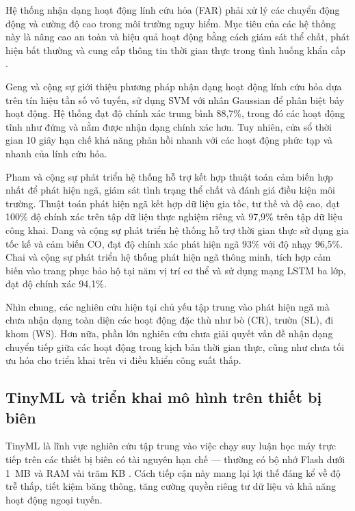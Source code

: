 Hệ thống nhận dạng hoạt động lính cứu hỏa (FAR) phải xử lý các chuyển động động và cường độ cao trong môi trường nguy hiểm. Mục tiêu của các hệ thống này là nâng cao an toàn và hiệu quả hoạt động bằng cách giám sát thể chất, phát hiện bất thường và cung cấp thông tin thời gian thực trong tình huống khẩn cấp \cite{Firefighterhealthcare2024, Thanhfire2019}.

Geng và cộng sự \cite{Geng2016} giới thiệu phương pháp nhận dạng hoạt động lính cứu hỏa dựa trên tín hiệu tần số vô tuyến, sử dụng SVM với nhân Gaussian để phân biệt bảy hoạt động. Hệ thống đạt độ chính xác trung bình 88,7\%, trong đó các hoạt động tĩnh như đứng và nằm được nhận dạng chính xác hơn. Tuy nhiên, cửa sổ thời gian 10 giây hạn chế khả năng phản hồi nhanh với các hoạt động phức tạp và nhanh của lính cứu hỏa.

Pham và cộng sự \cite{Thanhfire2019} phát triển hệ thống hỗ trợ kết hợp thuật toán cảm biến hợp nhất để phát hiện ngã, giám sát tình trạng thể chất và đánh giá điều kiện môi trường. Thuật toán phát hiện ngã kết hợp dữ liệu gia tốc, tư thế và độ cao, đạt 100\% độ chính xác trên tập dữ liệu thực nghiệm riêng và 97,9\% trên tập dữ liệu công khai. Dang và cộng sự \cite{Dang2022} phát triển hệ thống hỗ trợ thời gian thực sử dụng gia tốc kế và cảm biến CO, đạt độ chính xác phát hiện ngã 93\% với độ nhạy 96,5\%. Chai và cộng sự \cite{Chai2021} phát triển hệ thống phát hiện ngã thông minh, tích hợp cảm biến vào trang phục bảo hộ tại năm vị trí cơ thể và sử dụng mạng LSTM ba lớp, đạt độ chính xác 94,1\%.

Nhìn chung, các nghiên cứu hiện tại chủ yếu tập trung vào phát hiện ngã mà chưa nhận dạng toàn diện các hoạt động đặc thù như bò (CR), trườn (SL), đi khom (WS). Hơn nữa, phần lớn nghiên cứu chưa giải quyết vấn đề nhận dạng chuyển tiếp giữa các hoạt động trong kịch bản thời gian thực, cũng như chưa tối ưu hóa cho triển khai trên vi điều khiển công suất thấp.

\subsection{TinyML và triển khai mô hình trên thiết bị biên}

TinyML là lĩnh vực nghiên cứu tập trung vào việc chạy suy luận học máy trực tiếp trên các thiết bị biên có tài nguyên hạn chế — thường có bộ nhớ Flash dưới 1~MB và RAM vài trăm KB \cite{SurveyTinyML2023}. Cách tiếp cận này mang lại lợi thế đáng kể về độ trễ thấp, tiết kiệm băng thông, tăng cường quyền riêng tư dữ liệu và khả năng hoạt động ngoại tuyến.

